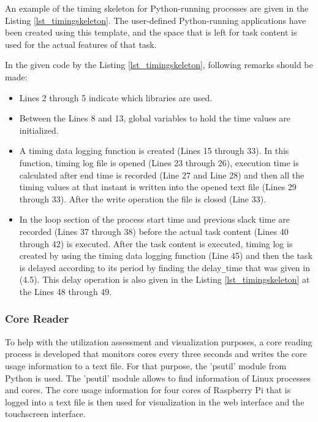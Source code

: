 An example of the timing skeleton for Python-running processes are given in the Listing \ref{lst_timingskeleton}. The user-defined Python-running applications have been created using this template, and the space that is left for task content is used for the actual features of that task.
\newpage


In the given code by the Listing \ref{lst_timingskeleton}, following remarks should be made:

\begin{itemize}
	\item Lines 2 through 5 indicate which libraries are used.
	\item Between the Lines 8 and 13, global variables to hold the time values are initialized.
	\item A timing data logging function is created (Lines 15 through 33). In this function, timing log file is opened (Lines 23 through 26), execution time is calculated after end time is recorded (Line 27 and Line 28) and then all the timing values at that instant is written into the opened text file (Lines 29 through 33). After the write operation the file is closed (Line 33).
	\item In the loop section of the process start time and previous slack time are recorded (Lines 37 through 38) before the actual task content (Lines 40 through 42) is executed. After the task content is executed, timing log is created by using the timing data logging function (Line 45) and then the task is delayed according to its period by finding the delay\texttt{\_}time that was given in (4.5). This delay operation is also given in the Listing \ref{lst_timingskeleton} at the Lines 48 through 49.  
\end{itemize}

\subsubsection{Core Reader}
To help with the utilization assessment and visualization purposes, a core reading process is developed that monitors cores every three seconds and writes the core usage information to a text file. For that purpose, the 'psutil' module \cite{psutil} from Python is used. The 'psutil' module allows to find information of Linux processes and cores. The core usage information for four cores of Raspberry Pi that is logged into a text file is then used for visualization in the web interface and the touchscreen interface. 

